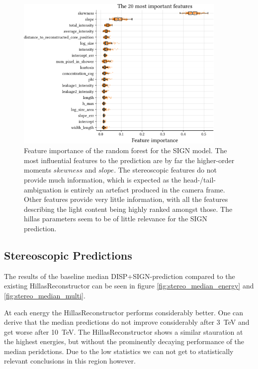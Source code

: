 \begin{figure}
	\centering
    \captionsetup{width=0.9\linewidth}
	\includegraphics[width=0.9\textwidth]{../analysis/plots/sign_features.pdf}
	\caption{Feature importance of the random forest for the SIGN model.
	        The most influential features to the prediction are by far the higher-order moments $skewness$
            and $slope$. The stereoscopic features do not provide much information,
            which is expected as the head-/tail-ambiguation is entirely an artefact produced
            in the camera frame. Other features provide very little information, with all
            the features describing the light content being highly ranked amongst those.
            The hillas parameters seem to be of little relevance for the SIGN prediction.}
	\label{fig:sign_features}
\end{figure}




\subsection{Stereoscopic Predictions}

The results of the baseline median DISP+SIGN-prediction
compared to the existing HillasReconstructor can be seen in figure \ref{fig:stereo_median_energy}
and \ref{fig:stereo_median_multi}.

At each energy the HillasReconstructor performs considerably better.
One can derive that the median predictions do not improve considerably after
\SI{3}{\tera\electronvolt} and get worse after \SI{10}{\tera\electronvolt}.
The HillasReconstructor shows a similar stauration at the highest energies,
but without the prominently decaying performance of the median peridctions.
Due to the low statistics we can not get to statistically relevant
conclusions in this region however.

